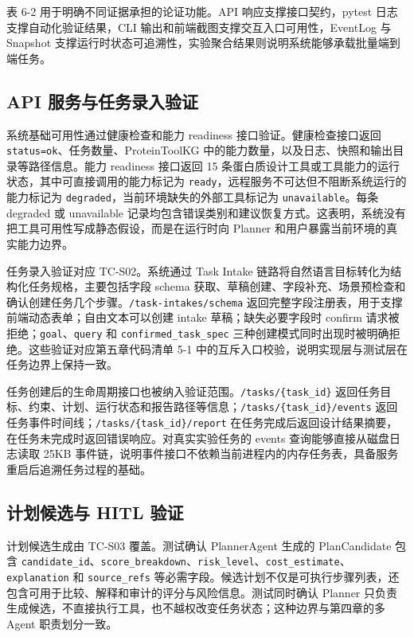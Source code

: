 表 6-2 用于明确不同证据承担的论证功能。API 响应支撑接口契约，pytest
日志支撑自动化验证结果，CLI 输出和前端截图支撑交互入口可用性，EventLog
与 Snapshot
支撑运行时状态可追溯性，实验聚合结果则说明系统能够承载批量端到端任务。

\subsection{API
服务与任务录入验证}\label{api-ux670dux52a1ux4e0eux4efbux52a1ux5f55ux5165ux9a8cux8bc1}

系统基础可用性通过健康检查和能力 readiness 接口验证。健康检查接口返回
\texttt{status=ok}、任务数量、ProteinToolKG
中的能力数量，以及日志、快照和输出目录等路径信息。能力 readiness
接口返回 15
条蛋白质设计工具或工具能力的运行状态，其中可直接调用的能力标记为
\texttt{ready}，远程服务不可达但不阻断系统运行的能力标记为
\texttt{degraded}，当前环境缺失的外部工具标记为
\texttt{unavailable}。每条 degraded 或 unavailable
记录均包含错误类别和建议恢复方式。这表明，系统没有把工具可用性写成静态假设，而是在运行时向
Planner 和用户暴露当前环境的真实能力边界。

任务录入验证对应 TC-S02。系统通过 Task Intake
链路将自然语言目标转化为结构化任务规格，主要包括字段 schema
获取、草稿创建、字段补充、场景预检查和确认创建任务几个步骤。\texttt{/task-intakes/schema}
返回完整字段注册表，用于支撑前端动态表单；自由文本可以创建 intake
草稿；缺失必要字段时 confirm 请求被拒绝；\texttt{goal}、\texttt{query}
和 \texttt{confirmed\_task\_spec}
三种创建模式同时出现时被明确拒绝。这些验证对应第五章代码清单 5-1
中的互斥入口校验，说明实现层与测试层在任务边界上保持一致。

任务创建后的生命周期接口也被纳入验证范围。\texttt{/tasks/\{task\_id\}}
返回任务目标、约束、计划、运行状态和报告路径等信息；\texttt{/tasks/\{task\_id\}/events}
返回任务事件时间线；\texttt{/tasks/\{task\_id\}/report}
在任务完成后返回设计结果摘要，在任务未完成时返回错误响应。对真实实验任务的
events 查询能够直接从磁盘日志读取 25KB
事件链，说明事件接口不依赖当前进程内的内存任务表，具备服务重启后追溯任务过程的基础。

\subsection{计划候选与 HITL
验证}\label{ux8ba1ux5212ux5019ux9009ux4e0e-hitl-ux9a8cux8bc1}

计划候选生成由 TC-S03 覆盖。测试确认 PlannerAgent 生成的 PlanCandidate
包含
\texttt{candidate\_id}、\texttt{score\_breakdown}、\texttt{risk\_level}、\texttt{cost\_estimate}、\texttt{explanation}
和 \texttt{source\_refs}
等必需字段。候选计划不仅是可执行步骤列表，还包含可用于比较、解释和审计的评分与风险信息。测试同时确认
Planner
只负责生成候选，不直接执行工具，也不越权改变任务状态；这种边界与第四章的多
Agent 职责划分一致。

